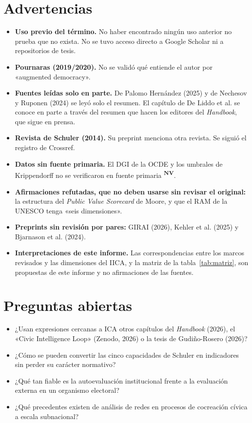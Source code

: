 \documentclass[11pt,a4paper]{article}
\newcommand{\nover}{\textsuperscript{\textcolor{aviso}{\textbf{NV}}}}
\begin{document}
\section{Advertencias}
\begin{itemize}
  \item \textbf{Uso previo del término.} No haber encontrado ningún uso anterior no prueba que no exista. No se tuvo acceso directo a Google Scholar ni a repositorios de tesis.
  \item \textbf{Pournaras (2019/2020).} No se validó qué entiende el autor por «augmented democracy».
  \item \textbf{Fuentes leídas solo en parte.} De Palomo Hernández (2025) y de Nechesov y Ruponen (2024) se leyó solo el resumen. El capítulo de De Liddo et al. se conoce en parte a través del resumen que hacen los editores del \emph{Handbook}, que sigue en prensa.
  \item \textbf{Revista de Schuler (2014).} Su preprint menciona otra revista. Se siguió el registro de Crossref.
  \item \textbf{Datos sin fuente primaria.} El DGI de la OCDE y los umbrales de Krippendorff no se verificaron en fuente primaria \nover.
  \item \textbf{Afirmaciones refutadas, que no deben usarse sin revisar el original:} la estructura del \emph{Public Value Scorecard} de Moore, y que el RAM de la UNESCO tenga «seis dimensiones».
  \item \textbf{Preprints sin revisión por pares:} GIRAI (2026), Kehler et al. (2025) y Bjarnason et al. (2024).
  \item \textbf{Interpretaciones de este informe.} Las correspondencias entre los marcos revisados y las dimensiones del IICA, y la matriz de la tabla~\ref{tab:matriz}, son propuestas de este informe y no afirmaciones de las fuentes.
\end{itemize}

\section{Preguntas abiertas}
\begin{itemize}
  \item ¿Usan expresiones cercanas a ICA otros capítulos del \emph{Handbook} (2026), el «Civic Intelligence Loop» (Zenodo, 2026) o la tesis de Gudiño-Rosero (2026)?
  \item ¿Cómo se pueden convertir las cinco capacidades de Schuler en indicadores sin perder su carácter normativo?
  \item ¿Qué tan fiable es la autoevaluación institucional frente a la evaluación externa en un organismo electoral?
  \item ¿Qué precedentes existen de análisis de redes en procesos de cocreación cívica a escala subnacional?
\end{itemize}
\end{document}
